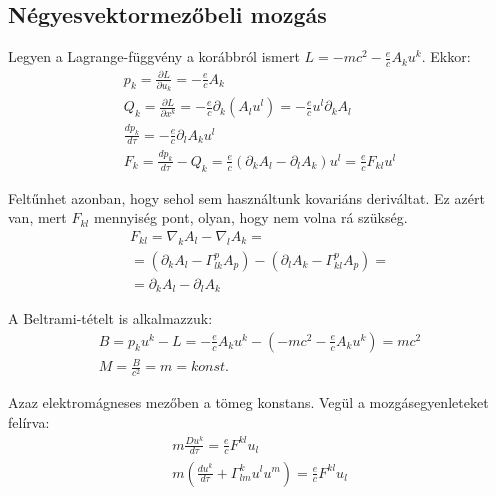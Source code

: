 \documentclass[a4paper,12pt]{article}
\begin{document}
\subsection{ Négyesvektormezőbeli mozgás}
\par Legyen a Lagrange-függvény a korábbról ismert $L = -mc^{2} - \frac{e}{c}A_{k}u^{k}$. Ekkor:
\begin{gather*}
    p_{k} = \frac{\partial L}{\partial u_{k}} = -\frac{e}{c}A_{k} \\
    Q_{k} = \frac{\partial L}{\partial x^{k}} = -\frac{e}{c}\partial_{k}(A_{l}u^{l}) = -\frac{e}{c}u^{l}\partial_{k}A_{l} \\
    \frac{dp_{k}}{d\tau} = -\frac{e}{c}\partial_{l}A_{k}u^{l} \\
    F_{k} = \frac{dp_{k}}{d\tau} - Q_{k} = \frac{e}{c}(\partial_{k}A_{l} - \partial_{l}A_{k})u^{l} = \frac{e}{c}F_{kl}u^{l}
\end{gather*}
\par Feltűnhet azonban, hogy sehol sem használtunk kovariáns deriváltat. Ez azért van, mert $F_{kl}$ mennyiség pont, olyan, hogy nem volna rá szükség.
\begin{align*}
    F_{kl} = \nabla_{k}A_{l} - \nabla_{l}A_{k} = \\
    = (\partial_{k}A_{l} - \Gamma_{lk}^{p}A_{p}) - (\partial_{l}A_{k} - \Gamma_{kl}^{p}A_{p}) = \\
    = \partial_{k}A_{l} - \partial_{l}A_{k}
\end{align*}
\par A Beltrami-tételt is alkalmazzuk:
\begin{gather*}
    B = p_{k}u^{k} - L = -\frac{e}{c}A_{k}u^{k} - (-mc^{2} - \frac{e}{c}A_{k}u^{k}) = mc^{2} \\
    M = \frac{B}{c^{2}} = m = konst.
\end{gather*}
\par Azaz elektromágneses mezőben a tömeg konstans. Vegül a mozgásegyenleteket felírva:
\begin{gather*}
    m\frac{Du^{k}}{d\tau} = \frac{e}{c}F^{kl}u_{l} \\
    m(\frac{du^{k}}{d\tau} + \Gamma_{lm}^{k}u^{l}u^{m}) = \frac{e}{c}F^{kl}u_{l} 
\end{gather*}
\end{document}
